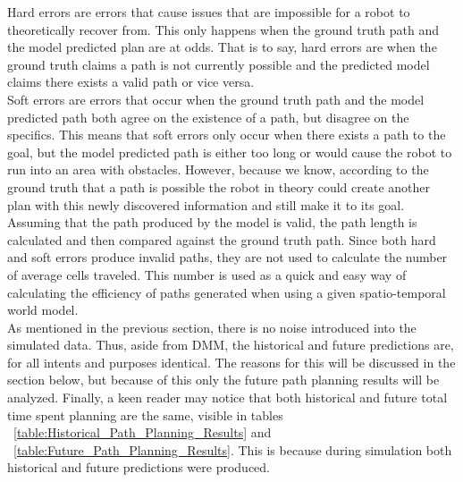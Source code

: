 Hard errors are errors that cause issues that are impossible for
a robot to theoretically recover from. This only happens when the ground truth
path and the model predicted plan are at odds. That is to say, hard errors are
when the ground truth claims a path is not currently possible and the predicted
model claims there exists a valid path or vice versa. \\

Soft errors are errors that occur when the ground truth path and the model
predicted path both agree on the existence of a path, but disagree on the
specifics. This means that soft errors only occur when there exists a path
to the goal, but the model predicted path is either too long or would cause
the robot to run into an area with obstacles. However, because we know,
according to the ground truth that a path is possible the robot in theory could
create another plan with this newly discovered information and still make it
to its goal. \\

Assuming that the path produced by the model is valid, the path
length is calculated and then compared against the ground truth path. Since
both hard and soft errors produce invalid paths, they are not used to
calculate the number of average cells traveled. This number is used as a quick and
easy way of calculating the efficiency of paths generated when using a given
spatio-temporal world model. \\

As mentioned in the previous section, there is no noise introduced
into the simulated data. Thus, aside from DMM, the historical and future
predictions are, for all intents and purposes identical. The reasons for this
will be discussed in the section below, but because of this only the future
path planning results will be analyzed. Finally, a keen reader may notice that both
historical and future total time spent planning are the same, visible in
tables ~\ref{table:Historical_Path_Planning_Results} and
  ~\ref{table:Future_Path_Planning_Results}. This is because
during simulation both historical and future predictions were produced. \\

